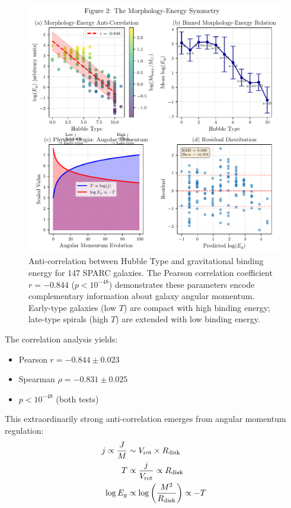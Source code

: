 \documentclass[aps,prd,twocolumn,superscriptaddress,nofootinbib,longbibliography]{revtex4-2}
\begin{document}
\begin{figure}[htbp]
\centering
\includegraphics[width=\columnwidth]{morphology_energy_correlation.pdf}
\caption{Anti-correlation between Hubble Type and gravitational binding energy for 147 SPARC galaxies. The Pearson correlation coefficient $r = -0.844$ ($p < 10^{-48}$) demonstrates these parameters encode complementary information about galaxy angular momentum. Early-type galaxies (low $T$) are compact with high binding energy; late-type spirals (high $T$) are extended with low binding energy.}
\label{fig:correlation}
\end{figure}

The correlation analysis yields:
\begin{itemize}
\item Pearson $r = -0.844 \pm 0.023$
\item Spearman $\rho = -0.831 \pm 0.025$  
\item $p < 10^{-48}$ (both tests)
\end{itemize}

This extraordinarily strong anti-correlation emerges from angular momentum regulation:
\begin{align}
j \propto \frac{J}{M} &\sim V_{\rm rot} \times R_{\rm disk} \\
T &\propto \frac{j}{V_{\rm rot}} \propto R_{\rm disk} \\
\log E_g &\propto \log\left(\frac{M^2}{R_{\rm disk}}\right) \propto -T
\end{align}
\end{document}
